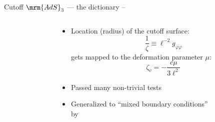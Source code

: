 \documentclass[aspectratio=169,10pt
	,noamsthm
]{beamer}
\begin{document}
\begin{frame}{Cutoff $\mrm{AdS}_3$ --- the dictionary}{%
	\textcite{McGough:2016lol} --
}
\begin{columns}
\begin{column}{.35\textwidth}
\figCutoffAds
\end{column}
\begin{column}{.65\textwidth}
	\begin{itemize}
	\item Location (radius) of the cutoff surface:
	\begin{equation}
		\frac{1}{\zeta} \equiv \ell^{-2} g_{\varphi\varphi} \label{cutoff}
	\end{equation}
	gets mapped to the deformation parameter $\mu$:
	\begin{equation}
		\zeta_c = - \frac{c \mu}{3\ell^2}
		\label{dictionary}
	\end{equation}
	
\pause
	
	\item Passed many non-trivial tests
	\item Generalized to ``mixed boundary conditions''\\
	by \textcite{Guica:2019nzm}
	
	\end{itemize}
\end{column}
\end{columns}
\end{frame}
\end{document}
